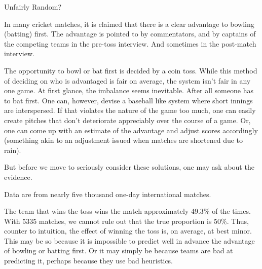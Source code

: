 Unfairly Random? 

In many cricket matches, it is claimed that there is a clear advantage to bowling (batting) first. The advantage is pointed to by commentators, and by captains of the competing teams in the pre-toss interview. And sometimes in the post-match interview.

The opportunity to bowl or bat first is decided by a coin toss. While this method of deciding on who is advantaged is fair on average, the system isn’t fair in any one game. At first glance, the imbalance seems inevitable. After all someone has to bat first. One can, however, devise a baseball like system where short innings are interspersed. If that violates the nature of the game too much, one can easily create pitches that don’t deteriorate appreciably over the course of a game. Or, one can come up with an estimate of the advantage and adjust scores accordingly (something akin to an adjustment issued when matches are shortened due to rain).

But before we move to seriously consider these solutions, one may ask about the evidence.

Data are from nearly five thousand one-day international matches.

The team that wins the toss wins the match approximately 49.3\% of the times. With 5335 matches, we cannot rule out that the true proportion is 50\%. Thus, counter to intuition, the effect of winning the toss is, on average, at best minor. This may be so because it is impossible to predict well in advance the advantage of bowling or batting first. Or it may simply be because teams are bad at predicting it, perhaps because they use bad heuristics.

